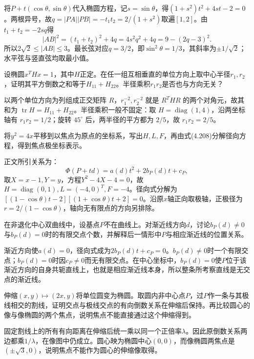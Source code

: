 将\(P+t(\cos\theta,\sin\theta)\)代入椭圆方程，记\(s=\sin\theta\)，得\((1+s^2)t^2+4st-2=0\)。两根异号，故\(q=|PA||PB|=-t_1t_2=2/(1+s^2)\)取遍\([1,2]\)。由\(t_1+t_2=-2sq\)得
\[
 |AB|^2=(t_1+t_2)^2+4q=4s^2q^2+4q=9-(2q-3)^2.
\]
所以\(2\sqrt2\le |AB|\le3\)。最长弦对应\(q=3/2\)，即\(\sin^2\theta=1/3\)，其斜率为\(\pm1/\sqrt2\)；水平弦与竖直弦均取最小值。

设椭圆\(x^THx=1\)，其中\(H\)正定。在任一组互相垂直的单位方向上取中心半径\(r_1,r_2\)，证明其平方倒数之和等于\(H_{11}+H_{22}\)。半径乘积\(r_1r_2\)是否也与方向无关？
\par
\solutionanswer
以两个单位方向为列组成正交矩阵 \(R\)，\(r_1^{-2},r_2^{-2}\) 就是 \(R^THR\) 的两个对角元，故其和为 \(\operatorname{tr}H=H_{11}+H_{22}\)。半径乘积一般不固定：取 \(H=\operatorname{diag}(1,4)\)，沿两坐标轴有 \(r_1r_2=1/2\)；旋转 \(45^\circ\) 后，两半径的平方都为 \(2/5\)，故 \(r_1r_2=2/5\)。


将\(y^2=4x\)平移到以焦点为原点的坐标系，写出\(H,L,F\)，再由式\textup{(4.208)}分解径向方程，得到焦点极坐标表示。
\par

\par\smallskip\noindent 正文所引关系为：
\begin{equation*}
\Phi(P+td)=a(d)t^2+2b_P(d)t+c_P,
\end{equation*}
\solutionanswer
取\(X=x-1,Y=y\)，方程\(Y^2-4X-4=0\)，故\(H=\operatorname{diag}(0,1),L=(-4,0)^T,F=-4\)。径向式分解为\([(1-\cos\theta)t-2][(1+\cos\theta)t+2]=0\)。沿原\(x\)轴正向取极轴，正极径为\(r=2/(1-\cos\theta)\)，轴向无有限点的方向另排除。


在非退化中心双曲线中，设基点\(P\)不在曲线上。对渐近线方向\(d\)，讨论\(b_P(d)\ne0\)与\(b_P(d)=0\)时的有限交点个数，并解释后一情形中\(P\)与相应渐近线的位置关系。
\par
\solutionanswer
渐近方向使\(a(d)=0\)，径向式成为\(2b_P(d)t+c_P=0\)。\(b_P(d)\ne0\)时一个有限交点；\(b_P(d)=0\)时因\(c_P\ne0\)而无有限交点。在中心坐标中，\(b_P(d)=0\)使\(P\)位于该渐近方向的自身共轭直线上，也就是相应渐近线本身，所以整条所考察直线是无交点的渐近线。


伸缩\((x,y)\mapsto(2x,y)\)将单位圆变为椭圆。取圆内非中心点\(P\)，过\(P\)作一条与其极线相交的割线，证明交点与极线交点的有向倒数关系在伸缩后保持。再比较圆心的像与像椭圆的两个焦点，说明焦点不能直接通过这个伸缩得到。
\par
\solutionanswer
固定割线上的所有有向距离在伸缩后统一乘以同一个正倍率\(\lambda\)。因此原倒数关系两边都乘\(1/\lambda\)，在像图中仍成立。圆心映为椭圆中心\((0,0)\)，而像椭圆两焦点是\((\pm\sqrt3,0)\)，说明焦点不能作为圆心的伸缩像取得。
\par
